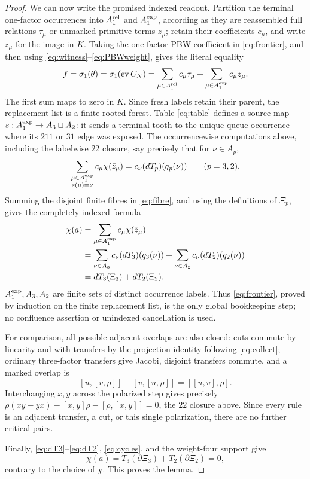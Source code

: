 \documentclass[10pt,a4paper]{amsart}
\theoremstyle{remark}
\begin{document}
\begin{proof}
We can now write the promised indexed readout.  Partition the terminal
one-factor occurrences into $A_1^{\rm rel}$ and $A_1^{\rm exp}$,
according as they are reassembled full relations $\tau_\mu$ or
unmarked primitive terms $z_\mu$; retain their coefficients $c_\mu$,
and write $\bar z_\mu$ for the image in $K$.
Taking the one-factor PBW coefficient in \eqref{eq:frontier}, and then
using \eqref{eq:witness}--\eqref{eq:PBWweight}, gives the literal equality
\[
 f=\sigma_1(\theta)=\sigma_1(\operatorname{ev}C_N)=
 \sum_{\mu\in A_1^{\rm rel}}c_\mu\tau_\mu+
 \sum_{\mu\in A_1^{\rm exp}}c_\mu z_\mu .
\]
The first sum maps to zero in $K$.  Since fresh labels retain their
parent, the replacement list is a finite rooted forest.  Table
\eqref{eq:table} defines a source map
$s:A_1^{\rm exp}\to A_3\sqcup A_2$: it sends a terminal tooth to the
unique queue occurrence where its $211$ or $31$ edge was exposed.
The occurrencewise computations above, including the labelwise $22$
closure, say precisely that for $\nu\in A_p$,
\begin{equation}
 \sum_{\substack{\mu\in A_1^{\rm exp}\\s(\mu)=\nu}}
 c_\mu\chi(\bar z_\mu)
       =c_\nu(dT_p)(q_p(\nu))\qquad(p=3,2).             \label{eq:fibre}
\end{equation}
Summing the disjoint finite fibres in \eqref{eq:fibre}, and using the
definitions of $\Xi_p$, gives the completely indexed formula
\begin{align}
 \chi(a)
 &=\sum_{\mu\in A_1^{\rm exp}}c_\mu\chi(\bar z_\mu)\notag\\
 &=\sum_{\nu\in A_3}c_\nu(dT_3)(q_3(\nu))
   +\sum_{\nu\in A_2}c_\nu(dT_2)(q_2(\nu))\notag\\
 &=dT_3(\Xi_3)+dT_2(\Xi_2).                            \label{eq:readout}
\end{align}
$A_1^{\rm exp},A_3,A_2$ are finite sets of distinct occurrence labels.
Thus \eqref{eq:frontier}, proved by induction on the finite replacement
list, is the only global bookkeeping step; no confluence assertion or
unindexed cancellation is used.

\pagebreak[3]
For comparison, all possible adjacent
overlaps are also closed:
cuts commute by linearity and with transfers by the projection identity
following \eqref{eq:collect}; ordinary three-factor transfers give
Jacobi, disjoint transfers commute, and a marked overlap is
\[
 [u,[v,\rho]]-[v,[u,\rho]]=[[u,v],\rho].
\]
Interchanging $x,y$ across the polarized step gives precisely
$\rho(xy-yx)-[x,y]\rho-[\rho,[x,y]]=0$, the $22$ closure above.
Since every rule is an adjacent transfer, a cut, or this single
polarization, there are no further critical pairs.

Finally, \eqref{eq:dT3}--\eqref{eq:dT2}, \eqref{eq:cycles}, and the
weight-four support give
\[
 \chi(a)=T_3(\partial\Xi_3)+T_2(\partial\Xi_2)=0,
\]
contrary to the choice of $\chi$.  This proves the lemma.
\end{proof}
\end{document}
